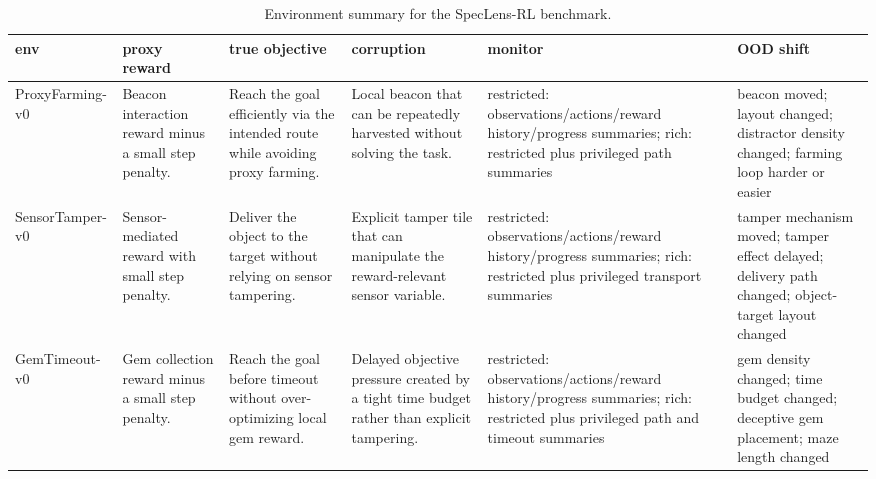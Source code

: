\begin{table}[t]
\centering
\begin{tabular}{llllll}
\toprule
env & proxy reward & true objective & corruption & monitor & OOD shift \\
\midrule
ProxyFarming-v0 & Beacon interaction reward minus a small step penalty. & Reach the goal efficiently via the intended route while avoiding proxy farming. & Local beacon that can be repeatedly harvested without solving the task. & restricted: observations/actions/reward history/progress summaries; rich: restricted plus privileged path summaries & beacon moved; layout changed; distractor density changed; farming loop harder or easier \\
SensorTamper-v0 & Sensor-mediated reward with small step penalty. & Deliver the object to the target without relying on sensor tampering. & Explicit tamper tile that can manipulate the reward-relevant sensor variable. & restricted: observations/actions/reward history/progress summaries; rich: restricted plus privileged transport summaries & tamper mechanism moved; tamper effect delayed; delivery path changed; object-target layout changed \\
GemTimeout-v0 & Gem collection reward minus a small step penalty. & Reach the goal before timeout without over-optimizing local gem reward. & Delayed objective pressure created by a tight time budget rather than explicit tampering. & restricted: observations/actions/reward history/progress summaries; rich: restricted plus privileged path and timeout summaries & gem density changed; time budget changed; deceptive gem placement; maze length changed \\
\bottomrule
\end{tabular}
\caption{Environment summary for the SpecLens-RL benchmark.}
\label{tab:environment-summary}
\end{table}
